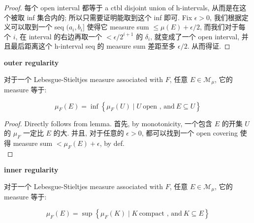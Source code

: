 \documentclass{qlnotes-export}
\begin{document}
\begin{proof}

每个 open interval 都等于 a ctbl disjoint union of h-intervals, 从而是在这个被取 inf 集合内的; 所以只需要证明能取到这个 inf 即可. Fix \(\epsilon > 0\), 我们根据定义可以取到一个 seq \((a_{i},b_{i}\rbrack\) 使得它 measure sum \(\leq \mu(E) + \epsilon/2\), 而我们对于每个 \(i\), 在 interval 的右边再取一个 \(< \epsilon/2^{i + 1}\) 的 \(\delta_{i}\), 就变成了一个 open interval, 并且最后距离这个 h-interval seq 的 measure sum 差距至多 \(\epsilon/2\). 从而得证.

\end{proof}

\begin{theorem}{\protect{}\label{kn-outer-regularity}{\textbf{\textbf{outer
regularity}}}}

对于一个 Lebesgue-Stieltjes measure associated with \(F\), 任意 \(E \in \mathcal{M}_{\mu}\), 它的 measure 等于:

\[\mu_{F}(E) = \inf\left\{ {\mu_{F}(U) \mid U\ \text{open , and}\ E \subseteq U} \right\}\]

\end{theorem}

\begin{proof}

Directly follows from lemma. 首先, by monotonicity, 一个包含 \(E\) 的开集 \(U\) 的 \(\mu_{F}\) 一定比 \(E\) 的大. 并且, 对于任意的 \(\epsilon > 0\), 都可以找到一个 open covering 使得 measure sum \(< \mu_{F}(E) + \epsilon\), by def.\\

\end{proof}

\begin{theorem}{\protect{}\label{kn-inner-regularity}{\textbf{\textbf{inner
regularity}}}}

对于一个 Lebesgue-Stieltjes measure associated with \(F\), 任意 \(E \in \mathcal{M}_{\mu}\), 它的 measure 等于:

\[\mu_{F}(E) = \sup\left\{ {\mu_{F}(K) \mid K\ \text{compact , and}\ K \subseteq E} \right\}\]

\end{theorem}
\end{document}
